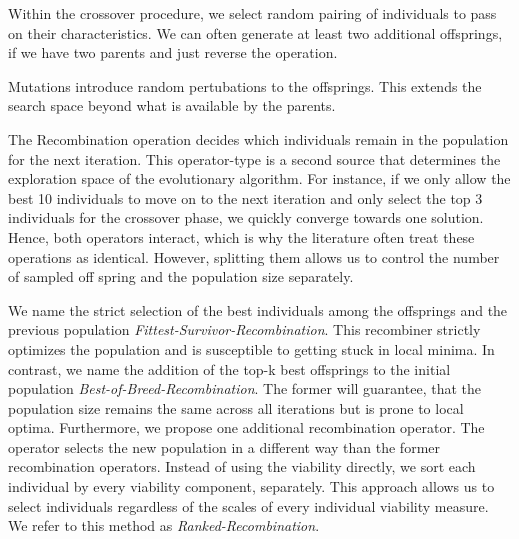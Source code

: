 \documentclass[./../../paper.tex]{subfiles}
\begin{document}
Within the crossover procedure, we select random pairing of individuals to pass on their characteristics. We can often generate at least two additional offsprings, if we have two parents and just reverse the operation.

Mutations introduce random pertubations to the offsprings. This extends the search space beyond what is available by the parents.  

The Recombination operation decides which individuals remain in the population for the next iteration\footnotemark[1]. This operator-type is a second source that determines the exploration space of the evolutionary algorithm. For instance, if we only allow the best 10 individuals to move on to the next iteration and only select the top 3 individuals for the crossover phase, we quickly converge towards one solution. Hence, both operators interact, which is why the literature often treat these operations as identical. However, splitting them allows us to control the number of sampled off spring and the population size separately.  








We name the strict selection of the best individuals among the offsprings and the previous population \emph{Fittest-Survivor-Recombination}. This recombiner strictly optimizes the population and is susceptible to getting stuck in local minima. 
In contrast, we name the addition of the top-k best offsprings to the initial population \emph{Best-of-Breed-Recombination}. The former will guarantee, that the population size remains the same across all iterations but is prone to local optima. Furthermore, we propose one additional recombination operator. The operator selects the new population in a different way than the former recombination operators. Instead of using the viability directly, we sort each individual by every viability component, separately. This approach allows us to select individuals regardless of the scales of every individual viability measure. We refer to this method as \emph{Ranked-Recombination}. 

\end{document}
